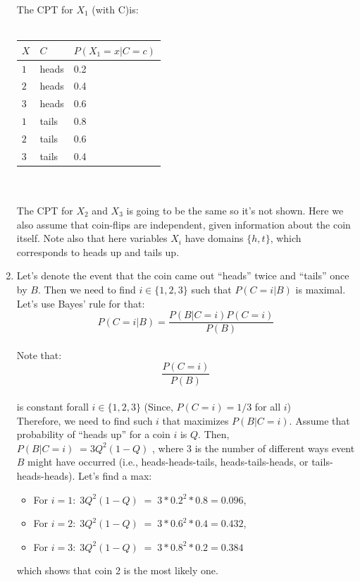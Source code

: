 \documentclass[11pt]{article}
\begin{document}
\begin{enumerate}[label=(\alph*)]
        The CPT for $X_1$ (with C)is:\\ \\
          \begin{tabular}{ | m{0.5cm} | m{1cm}| m{3cm} | }
            \hline
            $X$ & $C$ & $P(X_1=x|C=c)$ \\
            \hline
            $1$ & heads & 0.2 \\
            \hline
            $2$ & heads & 0.4 \\
            \hline
            $3$ & heads & 0.6 \\
            \hline
            $1$ & tails & 0.8 \\
            \hline
            $2$ & tails & 0.6 \\
            \hline
            $3$ & tails & 0.4 \\
            \hline
        \end{tabular}\\ \\
The CPT for $X_2$ and $X_3$ is going to be the same so it's not shown. Here we also assume that coin-flips are independent,
given information about the coin itself. Note also that here variables $X_i$ have domains $\{ h, t\}$, which corresponds to
heads up and tails up.
\item Let’s denote the event that the coin came out “heads” twice and “tails” once by $B$. Then we need to find $i \in \{ 1, 2, 3 \}$
such that $P(C=i|B)$ is maximal. Let’s use Bayes’ rule for that:\\
  \[ P(C=i|B)=\frac{P(B|C=i)P(C=i)}{P(B)} \]\\
Note that:\\ \[ \frac{P(C=i)}{P(B)} \] \\ is constant forall $i \in \{ 1, 2, 3 \}$ (Since, $P(C=i)=1/3$ for all $i$)\\
Therefore, we need to find such $i$ that maximizes $P(B|C=i)$. Assume that probability of “heads up” for a coin $i$ is $Q$.
Then, $P(B|C=i)\; = 3Q^2(1-Q)$ , where 3 is the number of different ways event $B$ might have occurred (i.e., heads-heads-tails,
heads-tails-heads, or tails-heads-heads). Let’s find a max:
\begin{itemize}
  \item For $i = 1:\; 3Q^2(1-Q)\; =\; 3*0.2^2*0.8 = 0.096 $,
  \item For $i = 2:\; 3Q^2(1-Q)\; =\; 3*0.6^2*0.4 = 0.432 $,
  \item For $i = 3:\; 3Q^2(1-Q)\; =\; 3*0.8^2*0.2 = 0.384 $
\end{itemize}
which shows that coin 2 is the most likely one.


\end{enumerate}
\end{document}
